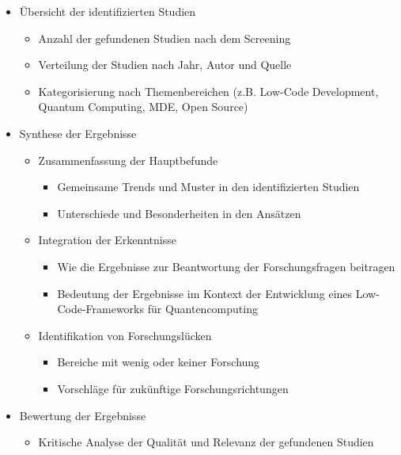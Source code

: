 \begin{itemize}
    \item Übersicht der identifizierten Studien
        \begin{itemize}
            \item Anzahl der gefundenen Studien nach dem Screening
            \item Verteilung der Studien nach Jahr, Autor und Quelle
            \item Kategorisierung nach Themenbereichen (z.B. Low-Code Development, Quantum Computing, MDE, Open Source)
        \end{itemize}
    \item Synthese der Ergebnisse
        \begin{itemize}
            \item Zusammenfassung der Hauptbefunde
                \begin{itemize}
                    \item Gemeinsame Trends und Muster in den identifizierten Studien
                    \item Unterschiede und Besonderheiten in den Ansätzen
                \end{itemize}
            \item Integration der Erkenntnisse
                \begin{itemize}
                    \item Wie die Ergebnisse zur Beantwortung der Forschungsfragen beitragen
                    \item Bedeutung der Ergebnisse im Kontext der Entwicklung eines Low-Code-Frameworks für Quantencomputing
                \end{itemize}
            \item Identifikation von Forschungslücken
                \begin{itemize}
                    \item Bereiche mit wenig oder keiner Forschung
                    \item Vorschläge für zukünftige Forschungsrichtungen
                \end{itemize}
        \end{itemize}
    \item Bewertung der Ergebnisse
        \begin{itemize}
            \item Kritische Analyse der Qualität und Relevanz der gefundenen Studien
                \begin{itemize}

\end{itemize}
\end{itemize}
\end{itemize}

